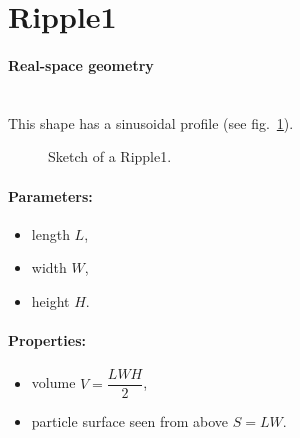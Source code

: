 \section{Ripple1}   

\paragraph{Real-space geometry}\mbox{}\\
This shape has a sinusoidal profile (see fig.~\ref{fig:ripple1}).

\begin{figure}[ht]
\hfill
{}
\hfill
{}
\hfill
\caption{Sketch of a Ripple1.}
\label{fig:ripple1}
\end{figure}

\paragraph{Parameters:}
\begin{itemize}
\item length $L$, 
\item width $W$, 
\item height $H$. 
\end{itemize}

\paragraph{Properties:}
\begin{itemize}
\item volume $V = \dfrac{L W H}{2} $,
\item particle surface seen from above $S = L W$.
\end{itemize}

